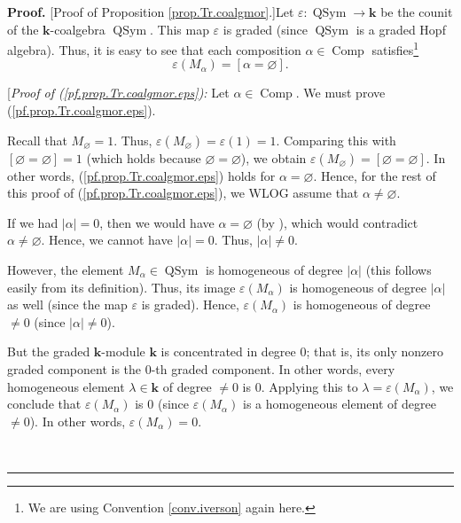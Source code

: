\documentclass[numbers=enddot,12pt,final,onecolumn,notitlepage]{scrartcl}%
\theoremstyle{definition}
\newenvironment{proof}[1][Proof]{\noindent\textbf{#1.} }{\ \rule{0.5em}{0.5em}}
\newenvironment{verlong}{}{}
\begin{document}
\begin{verlong}


\begin{proof}
[Proof of Proposition \ref{prop.Tr.coalgmor}.]Let $\varepsilon
:\operatorname*{QSym}\rightarrow\mathbf{k}$ be the counit of the $\mathbf{k}%
$-coalgebra $\operatorname*{QSym}$. This map $\varepsilon$ is graded (since
$\operatorname*{QSym}$ is a graded Hopf algebra). Thus, it is easy to see that
each composition $\alpha\in\operatorname*{Comp}$ satisfies\footnote{We are
using Convention \ref{conv.iverson} again here.}%
\begin{equation}
\varepsilon\left(  M_{\alpha}\right)  =\left[  \alpha=\varnothing\right]  .
\label{pf.prop.Tr.coalgmor.eps}%
\end{equation}


[\textit{Proof of (\ref{pf.prop.Tr.coalgmor.eps}):} Let $\alpha\in
\operatorname*{Comp}$. We must prove (\ref{pf.prop.Tr.coalgmor.eps}).

Recall that $M_{\varnothing}=1$. Thus, $\varepsilon\left(  M_{\varnothing
}\right)  =\varepsilon\left(  1\right)  =1$. Comparing this with $\left[
\varnothing=\varnothing\right]  =1$ (which holds because $\varnothing
=\varnothing$), we obtain $\varepsilon\left(  M_{\varnothing}\right)  =\left[
\varnothing=\varnothing\right]  $. In other words,
(\ref{pf.prop.Tr.coalgmor.eps}) holds for $\alpha=\varnothing$. Hence, for the
rest of this proof of (\ref{pf.prop.Tr.coalgmor.eps}), we WLOG assume that
$\alpha\neq\varnothing$.

If we had $\left\vert \alpha\right\vert =0$, then we would have $\alpha
=\varnothing$ (by \cite[Proposition 2.4]{comps}), which would contradict
$\alpha\neq\varnothing$. Hence, we cannot have $\left\vert \alpha\right\vert
=0$. Thus, $\left\vert \alpha\right\vert \neq0$.

However, the element $M_{\alpha}\in\operatorname*{QSym}$ is homogeneous of
degree $\left\vert \alpha\right\vert $ (this follows easily from its
definition). Thus, its image $\varepsilon\left(  M_{\alpha}\right)  $ is
homogeneous of degree $\left\vert \alpha\right\vert $ as well (since the map
$\varepsilon$ is graded). Hence, $\varepsilon\left(  M_{\alpha}\right)  $ is
homogeneous of degree $\neq0$ (since $\left\vert \alpha\right\vert \neq0$).

But the graded $\mathbf{k}$-module $\mathbf{k}$ is concentrated in degree $0$;
that is, its only nonzero graded component is the $0$-th graded component. In
other words, every homogeneous element $\lambda\in\mathbf{k}$ of degree
$\neq0$ is $0$. Applying this to $\lambda=\varepsilon\left(  M_{\alpha
}\right)  $, we conclude that $\varepsilon\left(  M_{\alpha}\right)  $ is $0$
(since $\varepsilon\left(  M_{\alpha}\right)  $ is a homogeneous element of
degree $\neq0$). In other words, $\varepsilon\left(  M_{\alpha}\right)  =0$.


\end{proof}
\end{verlong}
\end{document}
